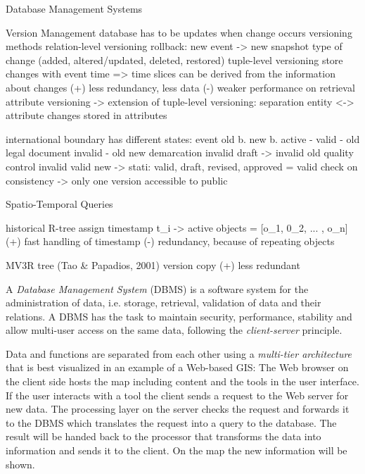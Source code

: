 Database Management Systems

Version Management
  database has to be updates when change occurs
  versioning methods
    relation-level versioning
      rollback: new event -> new snapshot
      type of change (added, altered/updated, deleted, restored)
    tuple-level versioning
      store changes with event time
      => time slices can be derived from the information about changes
      (+) less redundancy, less data
      (-) weaker performance on retrieval
    attribute versioning
      -> extension of tuple-level versioning: separation entity <-> attribute
      changes stored in attributes

  international boundary has different states:
    event           old b.    new b.              active
    -               valid     -                   old
    legal document  invalid   -                   old
    new demarcation invalid   draft -> invalid    old
    quality control invalid   valid               new
  -> stati: valid, draft, revised, approved = valid
  check on consistency -> only one version accessible to public

Spatio-Temporal Queries


historical R-tree
  assign timestamp t\_i -> active objects = [o\_1, 0\_2, ... , o\_n]
  (+) fast handling of timestamp
  (-) redundancy, because of repeating objects

MV3R tree (Tao \& Papadios, 2001)
  version copy
  (+) less redundant


A \emph{Database Management System} (DBMS) is a software system for the administration of data, i.e. storage, retrieval, validation of data and their relations. A DBMS has the task to maintain security, performance, stability and allow multi-user access on the same data, following the \emph{client-server} principle.

Data and functions are separated from each other using a \emph{multi-tier architecture} that is best visualized in an example of a Web-based GIS:
The Web browser on the client side hosts the map including content and the tools in the user interface. If the user interacts with a tool the client sends a request to the Web server for new data. The processing layer on the server checks the request and forwards it to the DBMS which translates the request into a query to the database. The result will be handed back to the processor that transforms the data into information and sends it to the client. On the map the new information will be shown.

